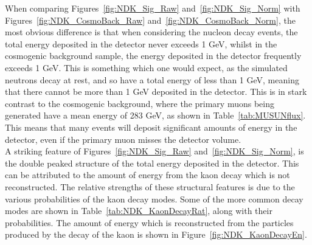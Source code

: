 When comparing Figures~\ref{fig:NDK_Sig_Raw} and~\ref{fig:NDK_Sig_Norm} with Figures~\ref{fig:NDK_CosmoBack_Raw} and~\ref{fig:NDK_CosmoBack_Norm}, the most obvious difference is that when considering the nucleon decay events, the total energy deposited in the detector never exceeds 1 GeV, whilst in the cosmogenic background sample, the energy deposited in the detector frequently exceeds 1 GeV. This is something which one would expect, as the simulated neutrons decay at rest, and so have a total energy of less than 1 GeV, meaning that there cannot be more than 1 GeV deposited in the detector. This is in stark contrast to the cosmogenic background, where the primary muons being generated have a mean energy of 283 GeV, as shown in Table~\ref{tab:MUSUNflux}. This means that many events will deposit significant amounts of energy in the detector, even if the primary muon misses the detector volume. \\

A striking feature of Figures~\ref{fig:NDK_Sig_Raw} and~\ref{fig:NDK_Sig_Norm}, is the double peaked structure of the total energy deposited in the detector. This can be attributed to the amount of energy from the kaon decay which is not reconstructed. The relative strengths of these structural features is due to the various probabilities of the kaon decay modes. Some of the more common decay modes are shown in Table~\ref{tab:NDK_KaonDecayRat}, along with their probabilities. The amount of energy which is reconstructed from the particles produced by the decay of the kaon is shown in Figure~\ref{fig:NDK_KaonDecayEn}. \\

